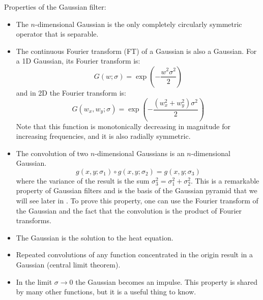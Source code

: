 Properties of the Gaussian filter:
\begin{itemize}
	\item The $n$-dimensional Gaussian is the only completely circularly symmetric operator that is separable.

	\item The continuous Fourier transform (FT) of a Gaussian is also a Gaussian. For a 1D Gaussian, its Fourier transform is:
	      \begin{equation}
		      G (w; \sigma) = \exp{ \left( -\frac{w^2 \sigma^2} {2} \right) }
	      \end{equation}
	      and in 2D the Fourier transform is:
	      \begin{equation}
		      G (w_x, w_y; \sigma) = \exp{ \left(- \frac{(w_x^2+w_y^2) \sigma^2} {2} \right) }
		      \label{eq:FTgauss2d}
	      \end{equation}
	      Note that this function is monotonically decreasing in magnitude for increasing frequencies, and it is also radially symmetric.

	\item The convolution of two $n$-dimensional Gaussians is an $n$-dimensional Gaussian.
	      \begin{equation}
		      g (x,y; \sigma_1 ) \circ g (x,y; \sigma_2)  = g (x,y; \sigma_3)
	      \end{equation}
	      where the variance of the result is the sum $\sigma_3^2 = \sigma_1^2 + \sigma_2^2$. This is a remarkable property of Gaussian filters and is the basis of the Gaussian pyramid that we will see later in \chap{\ref{chapter:image_pyramids}}. To prove this property, one can use the Fourier transform of the Gaussian and the fact that the convolution is the product of Fourier transforms.

	\item The Gaussian is the solution to the heat equation.

	\item Repeated convolutions of any function concentrated in the origin result in a Gaussian (central limit theorem).

	\item In the limit $\sigma \rightarrow 0$ the Gaussian becomes an impulse. This property is shared by many other functions, but it is a useful thing to know.
\end{itemize}

